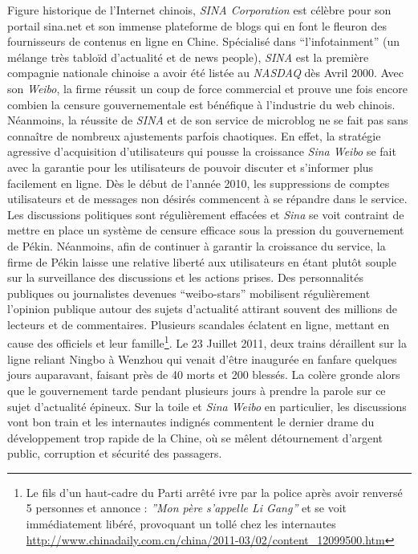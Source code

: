 Figure historique de l’Internet chinois, \textit{SINA Corporation} est célèbre pour son portail sina.net et son immense plateforme de blogs qui en font le fleuron des fournisseurs de contenus en ligne en Chine. Spécialisé dans “l’infotainment” (un mélange très tabloïd d’actualité et de news people), \textit{SINA} est la première compagnie nationale chinoise a avoir été listée au \textit{NASDAQ} dès Avril 2000. Avec son \textit{Weibo}, la firme réussit un coup de force commercial et prouve une fois encore combien la censure gouvernementale est bénéfique à l’industrie du web chinois. Néanmoins, la réussite de \textit{SINA} et de son service de microblog ne se fait pas sans connaître de nombreux ajustements parfois chaotiques. En effet, la stratégie agressive d’acquisition d’utilisateurs qui pousse la croissance \textit{Sina Weibo} se fait avec la garantie pour les utilisateurs de pouvoir discuter et s’informer plus facilement en ligne. Dès le début de l’année 2010, les suppressions de comptes utilisateurs et de messages non désirés commencent à se répandre dans le service. Les discussions politiques sont régulièrement effacées et \textit{Sina} se voit contraint de mettre en place un système de censure efficace sous la pression du gouvernement de Pékin. Néanmoins, afin de continuer à garantir la croissance du service, la firme de Pékin laisse une relative liberté aux utilisateurs en étant plutôt souple sur la surveillance des discussions et les actions prises. Des personnalités publiques ou journalistes devenues “weibo-stars” mobilisent régulièrement l’opinion publique autour des sujets d’actualité attirant souvent des millions de lecteurs et de commentaires. Plusieurs scandales éclatent en ligne, mettant en cause des officiels et leur famille\footnote{Le fils d’un haut-cadre du Parti arrêté ivre par la police après avoir renversé 5 personnes et annonce : \textit{”Mon père s’appelle Li Gang”} et se voit immédiatement libéré, provoquant un tollé chez les internautes \url{http://www.chinadaily.com.cn/china/2011-03/02/content_12099500.htm}}. Le 23 Juillet 2011, deux trains déraillent sur la ligne reliant Ningbo à Wenzhou qui venait d’être inaugurée en fanfare quelques jours auparavant, faisant près de 40 morts et 200 blessés. La colère gronde alors que le gouvernement tarde pendant plusieurs jours à prendre la parole sur ce sujet d’actualité épineux. Sur la toile et \textit{Sina Weibo} en particulier, les discussions vont bon train et les internautes indignés commentent le dernier drame du développement trop rapide de la Chine, où se mêlent détournement d’argent public, corruption et sécurité des passagers. 


